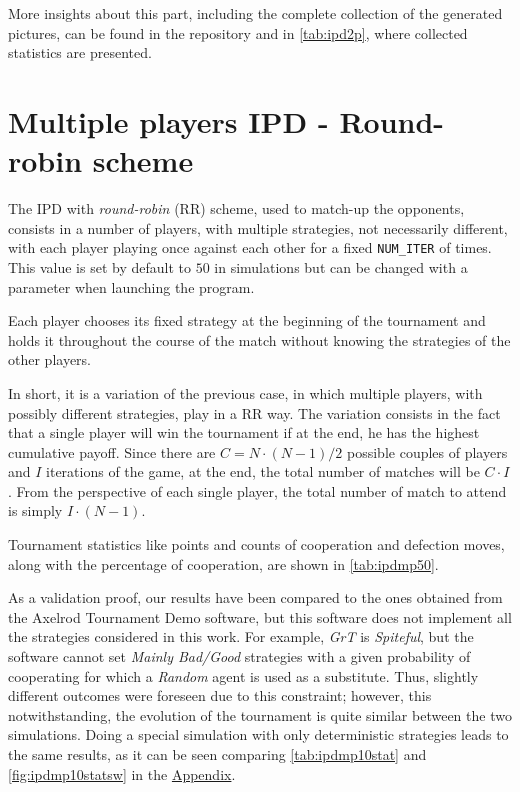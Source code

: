 \documentclass[journal,10pt,twoside]{IEEEtran}
\begin{document}
More insights about this part, including the complete collection of the generated pictures, can be found in the repository and in \autoref{tab:ipd2p}, where collected statistics are presented.

\section{Multiple players IPD - Round-robin scheme} \label{s:IPDMP}
The IPD with \textit{round-robin} (RR) scheme, used to match-up the opponents, consists in a number of players, with multiple strategies, not necessarily different, with each player playing once against each other for a fixed \texttt{NUM\_ITER} of times. This value is set by default to $50$ in simulations but can be changed with a parameter when launching the program.

Each player chooses its fixed strategy at the beginning of the tournament and holds it throughout the course of the match without knowing the strategies of the other players.

In short, it is a variation of the previous case, in which multiple players, with possibly different strategies, play in a RR way. The variation consists in the fact that a single player will win the tournament if at the end, he has the highest cumulative payoff.
Since there are $C=N\cdot (N-1)/2$ possible couples of players and $I$ iterations of the game, at the end, the total number of matches will be $C\cdot I$. From the perspective of each single player, the total number of match to attend is simply $I\cdot(N-1)$.

Tournament statistics like points and counts of cooperation and defection moves, along with the percentage of cooperation, are shown in \autoref{tab:ipdmp50}.

As a validation proof, our results have been compared to the ones obtained from the Axelrod Tournament Demo software, \cite{demosw} but this software does not implement all the strategies considered in this work. For example, \textit{GrT} is \textit{Spiteful}, but the software cannot set \textit{Mainly Bad/Good} strategies with a given probability of cooperating for which a \textit{Random} agent is used as a substitute. Thus, slightly different outcomes were foreseen due to this constraint; however, this notwithstanding, the evolution of the tournament is quite similar between the two simulations.
Doing a special simulation with only deterministic strategies leads to the same results, as it can be seen comparing \autoref{tab:ipdmp10stat} and \autoref{fig:ipdmp10statsw} in the \hyperref[s:appendix]{Appendix}.
\end{document}
